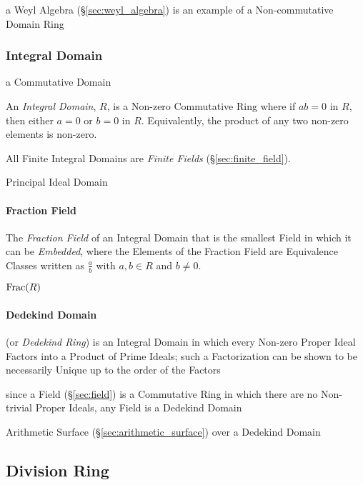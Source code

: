 a Weyl Algebra (\S\ref{sec:weyl_algebra}) is an example of a Non-commutative
Domain Ring



\subsubsection{Integral Domain}\label{sec:integral_domain}

a Commutative Domain

An \emph{Integral Domain}, $R$, is a Non-zero Commutative Ring where
if $ab = 0$ in $R$, then either $a = 0$ or $b = 0$ in $R$.
Equivalently, the product of any two non-zero elements is non-zero.

All Finite Integral Domains are \emph{Finite Fields}
(\S\ref{sec:finite_field}).

Principal Ideal Domain



\paragraph{Fraction Field}\label{sec:fraction_field}\hfill

The \emph{Fraction Field} of an Integral Domain that is the smallest Field in
which it can be \emph{Embedded}, where the Elements of the Fraction Field are
Equivalence Classes written as $\frac{a}{b}$ with $a, b \in R$ and $b \neq 0$.

$\mathrm{Frac}(R)$



\paragraph{Dedekind Domain}\label{sec:dedekind_domain}\hfill

(or \emph{Dedekind Ring}) is an Integral Domain in which every Non-zero Proper
Ideal Factors into a Product of Prime Ideals; such a Factorization can be shown
to be necessarily Unique up to the order of the Factors

since a Field (\S\ref{sec:field}) is a Commutative Ring in which there are no
Non-trivial Proper Ideals, any Field is a Dedekind Domain

\fist Arithmetic Surface (\S\ref{sec:arithmetic_surface}) over a Dedekind Domain



\subsection{Division Ring}\label{sec:division_ring}

